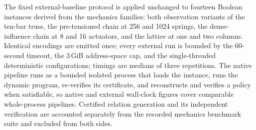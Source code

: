\documentclass[11pt]{article}
\theoremstyle{plain}
\theoremstyle{definition}
\theoremstyle{remark}
\begin{document}
The fixed external-baseline protocol is applied unchanged to fourteen
Boolean instances derived from the mechanics families: both observation
variants of the ten-bar truss, the pre-tensioned chain at 256 and 1024
springs, the dense-influence chain at 8 and 16 actuators, and the lattice at
one and two columns.  Identical encodings are emitted once; every external
run is bounded by the 60-second timeout, the 3\,GiB address-space cap, and
the single-threaded deterministic configurations; timings are medians of
three repetitions.  The native pipeline runs as a bounded isolated process
that loads the instance, runs the dynamic program, re-verifies its
certificate, and reconstructs and verifies a policy when satisfiable, so
native and external wall-clock figures cover comparable whole-process
pipelines.  Certified relation generation and its independent verification
are accounted separately from the recorded mechanics benchmark suite and
excluded from both sides.
\end{document}
